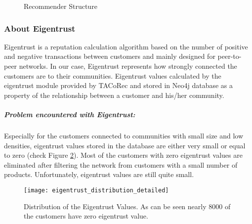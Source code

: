 \label{eigentrust_section}
	\begin{figure}[H]
		\centering
		\caption{Recommender Structure}
		\label{fig:eigentrust_structure}
	\end{figure}
	\subsubsection{About Eigentrust} \label{about_eigentrust}
	Eigentrust\cite{Eigentrust} is a reputation calculation algorithm based on the number of positive and negative transactions between customers and mainly designed for peer-to-peer networks. In our case, Eigentrust represents how strongly connected the customers are to their communities. Eigentrust values calculated by the eigentrust module provided by TACoRec\cite{Tacorec} and stored in Neo4j database as a property of the relationship between a customer and his/her community. 
	\subparagraph{Problem encountered with Eigentrust:}
	Especially for the customers connected to communities with small size and low densities, eigentrust values stored in the database are either very small or equal to zero (check Figure \ref{fig:eigentrust_distribution_figure}). Most of the customers with zero eigentrust values are eliminated after filtering the network from customers with a small number of products. Unfortunately, eigentrust values ​​are still quite small.
\begin{figure}[h]
	\centering
	\texttt{[image: eigentrust\_distribution\_detailed]}
	\caption{Distribution of the Eigentrust Values. As can be seen nearly 8000 of the customers have zero eigentrust value.}
	\label{fig:eigentrust_distribution_figure}
\end{figure}
